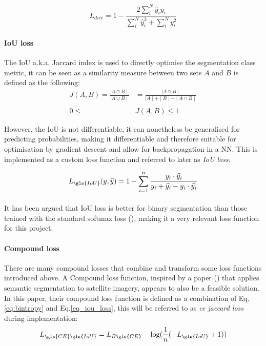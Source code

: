 \begin{equation}\label{eq_dice_loss}
L_{dice}=1-\frac{2\sum_{{i}}^{N}\widehat{y}_{i}y_{i}}{\sum_{i}^{N}\widehat{y}_{i}^{2}+\sum_{i}^{N}y_{{i}}^{2}}
\end{equation}

\paragraph{\gls{IoU} loss}
The \gls{IoU} \gls{a.k.a.} Jaccard index is used to directly optimise the segmentation class metric, it can be seen as a similarity measure between two sets $A$ and $B$ is defined as the following:
\begin{equation}
\label{eq_jaccard}
\begin{aligned}
J(A, B) = \frac{\mid A \cap B \mid }{\mid A \cup B \mid} &= \frac{\mid A \cap B \mid}{\mid A \mid + \mid B \mid - \mid A \cap B \mid} \\ \\
0 \le & J(A, B) \le 1
\end{aligned}
\end{equation}

However, the \gls{IoU} is not differentiable, it can nonetheless be generalised for predicting probabilities, making it differentiable and therefore suitable for optimisation by gradient descent and allow for backpropagation in a \gls{NN}. This is implemented as a custom loss function and referred to later as \textit{\gls{IoU} loss}.

\begin{equation} \label{eq_iou_loss}
L_{\gls{IoU}}(y, \widehat{y}) = 1- \sum_{i=1}^n \frac{y_i \cdot \widehat{y_i}}{y_i + \widehat{y_i} - y_i \cdot \widehat{y_i}}
\end{equation}
\paragraph{}
It has been argued that \gls{IoU} loss is better for binary segmentation than those trained with the standard softmax loss (\cite{Rahman_2016}), making it a very relevant loss function for this project.
\paragraph{Compound loss}
There are many compound losses that combine and transform some loss functions introduced above. A Compound loss function, inspired by a paper (\cite{DBLP:journals/corr/IglovikovMO17}) that applies semantic segmentation to satellite imagery, appears to also be a feasible solution.
In this paper, their compound loss function is defined as a combination of Eq.\ref{eq:bintropy} and Eq.\ref{eq_iou_loss}, this will be referred to as \textit{ce jaccard loss} during implementation:
\begin{equation}
L_{\gls{CE} \gls{IoU}} = L_{B\gls{CE}} - \log (\frac{1}{n} (-L_{\gls{IoU}}+1))
\end{equation}

